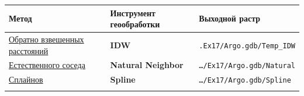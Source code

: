 \documentclass[12pt,]{book}
\begin{document}
\begin{longtable}[]{@{}lll@{}}
\toprule
\begin{minipage}[b]{0.12\columnwidth}\raggedright
Метод\strut
\end{minipage} & \begin{minipage}[b]{0.50\columnwidth}\raggedright
Инструмент геообработки\strut
\end{minipage} & \begin{minipage}[b]{0.30\columnwidth}\raggedright
Выходной растр\strut
\end{minipage}\tabularnewline
\midrule
\endhead
\begin{minipage}[t]{0.12\columnwidth}\raggedright
\href{http://desktop.arcgis.com/ru/arcmap/latest/tools/3d-analyst-toolbox/how-idw-works.htm}{Обратно взвешенных расстояний}\strut
\end{minipage} & \begin{minipage}[t]{0.50\columnwidth}\raggedright
\textbf{IDW}\strut
\end{minipage} & \begin{minipage}[t]{0.30\columnwidth}\raggedright
\texttt{.Ex17/Argo.gdb/Temp\_IDW}\strut
\end{minipage}\tabularnewline
\begin{minipage}[t]{0.12\columnwidth}\raggedright
\href{http://desktop.arcgis.com/ru/arcmap/latest/tools/3d-analyst-toolbox/how-natural-neighbor-works.htm}{Естественного соседа}\strut
\end{minipage} & \begin{minipage}[t]{0.50\columnwidth}\raggedright
\textbf{Natural Neighbor}\strut
\end{minipage} & \begin{minipage}[t]{0.30\columnwidth}\raggedright
\texttt{\ldots{}/Ex17/Argo.gdb/Natural}\strut
\end{minipage}\tabularnewline
\begin{minipage}[t]{0.12\columnwidth}\raggedright
\href{http://desktop.arcgis.com/ru/arcmap/latest/tools/3d-analyst-toolbox/how-spline-works.htm}{Сплайнов}\strut
\end{minipage} & \begin{minipage}[t]{0.50\columnwidth}\raggedright
\textbf{Spline}\strut
\end{minipage} & \begin{minipage}[t]{0.30\columnwidth}\raggedright
\texttt{\ldots{}/Ex17/Argo.gdb/Spline}\strut
\end{minipage}\tabularnewline
\begin{minipage}[t]{0.12\columnwidth}\raggedright

\end{minipage}
\end{longtable}
\end{document}

